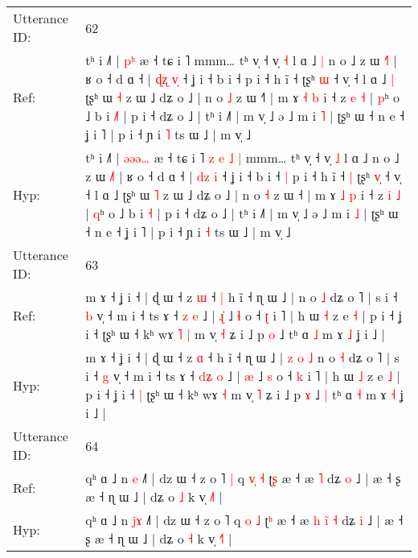 \documentclass[10pt]{article}
\DeclareRobustCommand{\hl}[1]{{\textcolor{red}{#1}}}
\begin{document}
\begin{longtable}{ll}
 \\
\midrule
Utterance ID: & 62 \\
Ref: & tʰ i ˩˥ | \hl{}\hl{}\hl{p}\hl{ʰ} æ ˧ tɕ i ˥\hl{}\hl{}\hl{}\hl{}\hl{}\hl{}\hl{}\hl{} mmm… tʰ v̩ ˧ v̩ \hl{˧} l ɑ ˩\hl{ }\hl{|} n o ˩ z ɯ \hl{˧}˥ | ʁ o ˧ d ɑ ˧ | \hl{ɖ}\hl{ʐ} \hl{v}\hl{̩} ˧ ʝ i ˧ b i ˧\hl{}\hl{} p i ˧ h ĩ ˧\hl{}\hl{} ʈʂʰ \hl{}\hl{ɯ} ˧ v̩ ˧ l ɑ ˩\hl{ }\hl{|} ʈʂʰ ɯ \hl{˧} z ɯ ˩ dʑ o ˩ | n o \hl{˩} z ɯ ˧\hl{˥} | m ɤ \hl{˧} \hl{b} i ˧ z \hl{e} \hl{˧} | \hl{p}ʰ o ˩ b i \hl{˩}\hl{˥} | p i ˧ dʑ o ˩ | tʰ i ˩˥ | m v̩ ˩ ə ˩ m i \hl{˥} | ʈʂʰ ɯ ˧ n e ˧ ʝ i ˥ | p i ˧ ɲ i \hl{˥} ts ɯ ˩ | m v̩ ˩
 \\
Hyp: & tʰ i ˩˥ | \hl{ə}\hl{ə}\hl{ə}\hl{…} æ ˧ tɕ i ˥\hl{ }\hl{z}\hl{ }\hl{e}\hl{ }\hl{˩}\hl{ }\hl{|} mmm… tʰ v̩ ˧ v̩ \hl{˩} l ɑ ˩\hl{}\hl{} n o ˩ z ɯ \hl{˩}˥ | ʁ o ˧ d ɑ ˧ | \hl{d}\hl{z} \hl{}\hl{i} ˧ ʝ i ˧ b i ˧\hl{ }\hl{|} p i ˧ h ĩ ˧\hl{ }\hl{|} ʈʂʰ \hl{v}\hl{̩} ˧ v̩ ˧ l ɑ ˩\hl{}\hl{} ʈʂʰ ɯ \hl{˥} z ɯ ˩ dʑ o ˩ | n o \hl{˧} z ɯ ˧\hl{} | m ɤ \hl{˩} \hl{p} i ˧ z \hl{i} \hl{˩} | \hl{q}ʰ o ˩ b i \hl{}\hl{˧} | p i ˧ dʑ o ˩ | tʰ i ˩˥ | m v̩ ˩ ə ˩ m i \hl{˩} | ʈʂʰ ɯ ˧ n e ˧ ʝ i ˥ | p i ˧ ɲ i \hl{˧} ts ɯ ˩ | m v̩ ˩
 \\
\midrule
Utterance ID: & 63 \\
Ref: & m ɤ ˧ ʝ i ˧ | ɖ ɯ ˧ z \hl{ɯ} ˧\hl{ }\hl{|} h ĩ ˧ ɳ ɯ ˩ |\hl{}\hl{}\hl{}\hl{}\hl{}\hl{} n o \hl{˩} dʑ o ˥ | s i ˧ \hl{b} v̩ ˧ m i ˧ ts ɤ ˧ \hl{}\hl{z} \hl{e} ˩ | \hl{ɻ}\hl{̍} ˩ \hl{ɬ} o ˧ \hl{ʈ} i ˥ | h ɯ \hl{˧} z e \hl{˧} | p i ˧ ʝ i ˧\hl{}\hl{} ʈʂʰ ɯ ˧ kʰ wɤ\hl{ }\hl{˥} \hl{|} m v̩ \hl{˧} ʑ i ˩ p \hl{o} ˩\hl{}\hl{} tʰ ɑ \hl{˩} m ɤ \hl{˩} ʝ i ˩ |
 \\
Hyp: & m ɤ ˧ ʝ i ˧ | ɖ ɯ ˧ z \hl{ɑ} ˧\hl{}\hl{} h ĩ ˧ ɳ ɯ ˩ |\hl{ }\hl{z}\hl{ }\hl{o}\hl{ }\hl{˩} n o \hl{˧} dʑ o ˥ | s i ˧ \hl{g} v̩ ˧ m i ˧ ts ɤ ˧ \hl{d}\hl{ʑ} \hl{o} ˩ | \hl{}\hl{æ} ˩ \hl{s} o ˧ \hl{k} i ˥ | h ɯ \hl{˩} z e \hl{˩} | p i ˧ ʝ i ˧\hl{ }\hl{|} ʈʂʰ ɯ ˧ kʰ wɤ\hl{}\hl{} \hl{˧} m v̩ \hl{˥} ʑ i ˩ p \hl{ɤ} ˩\hl{ }\hl{|} tʰ ɑ \hl{˧} m ɤ \hl{˧} ʝ i ˩ |
 \\
\midrule
Utterance ID: & 64 \\
Ref: & qʰ ɑ ˩ n \hl{}\hl{e} ˩˥ | dz ɯ ˧ z o ˥\hl{ }\hl{|} q \hl{v}\hl{̩} \hl{˧} ʈ\hl{ʂ} æ ˧ æ\hl{}\hl{}\hl{}\hl{}\hl{} \hl{˥} dʑ \hl{o} ˩ | æ ˧ ʂ æ ˧ ɳ ɯ ˩ | dʑ o \hl{˩} k v̩ \hl{˩}˥ |
 \\
Hyp: & qʰ ɑ ˩ n \hl{j}\hl{ɤ} ˩˥ | dz ɯ ˧ z o ˥\hl{}\hl{} q \hl{}\hl{o} \hl{˩} ʈ\hl{ʰ} æ ˧ æ\hl{ }\hl{h}\hl{ }\hl{i}\hl{̃} \hl{˧} dʑ \hl{i} ˩ | æ ˧ ʂ æ ˧ ɳ ɯ ˩ | dʑ o \hl{˧} k v̩ \hl{˧}˥ |
 \\

\end{longtable}
\end{document}
